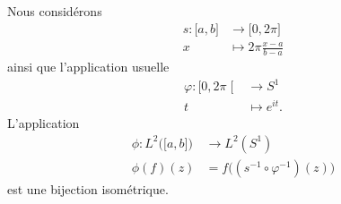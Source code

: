 \begin{proposition}		\label{PROPooLNALooSVNMfe}
	Nous considérons
	\begin{equation}
		\begin{aligned}
			s\colon \mathopen[ a , b \mathclose] & \to \mathopen[ 0 , 2\pi \mathclose] \\
			x                                    & \mapsto 2\pi\frac{ x-a }{ b-a }
		\end{aligned}
	\end{equation}
	ainsi que l'application usuelle
	\begin{equation}
		\begin{aligned}
			\varphi\colon \mathopen[ 0 , 2\pi \mathclose[ & \to S^1          \\
			t                                             & \mapsto  e^{it}.
		\end{aligned}
	\end{equation}
	L'application
	\begin{equation}
		\begin{aligned}
			\phi\colon L^2\big( \mathopen[ a , b \mathclose] \big) & \to L^2(S^1)                                \\
			\phi(f)(z)                                             & =f\big( (s^{-1}\circ \varphi^{-1})(z) \big)
		\end{aligned}
	\end{equation}
	est une bijection isométrique.
\end{proposition}

